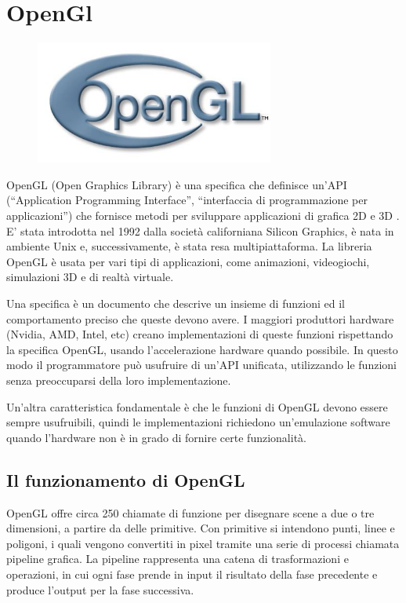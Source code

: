 
\section{OpenGl}

\begin{figure}[hbp]
\centering
\includegraphics[width=0.7\textwidth]{images/openGL/OpenGL_logo.jpg}
\end{figure}


OpenGL (Open Graphics Library) è una specifica che definisce un'API (“Application Programming Interface”, “interfaccia di programmazione per applicazioni”) che fornisce metodi per sviluppare applicazioni di grafica 2D e 3D \cite{opengl-wiki}. E' stata introdotta nel 1992 dalla società californiana Silicon Graphics, è nata in ambiente Unix e, successivamente, è stata resa multipiattaforma. La libreria OpenGL è usata per vari tipi di applicazioni, come animazioni, videogiochi, simulazioni 3D e di realtà virtuale.

Una specifica è un documento che descrive un insieme di funzioni ed il comportamento preciso che queste devono avere. I maggiori produttori hardware (Nvidia, AMD, Intel, etc) creano implementazioni di queste funzioni rispettando la specifica OpenGL, usando l'accelerazione hardware quando possibile. In questo modo il programmatore può usufruire di un'API unificata, utilizzando le funzioni senza preoccuparsi della loro implementazione.

Un'altra caratteristica fondamentale è che le funzioni di OpenGL devono essere sempre usufruibili, quindi le implementazioni richiedono un'emulazione software quando l'hardware non è in grado di fornire certe funzionalità.

\subsection{Il funzionamento di OpenGL}
OpenGL offre circa 250 chiamate di funzione per disegnare scene a due  o tre dimensioni, a partire da delle primitive. Con primitive si intendono punti, linee e poligoni, i quali vengono convertiti in pixel tramite una serie di processi chiamata pipeline grafica.
La pipeline rappresenta una catena di trasformazioni e operazioni, in cui ogni fase prende in input il risultato della fase precedente e produce l'output per la fase successiva.


